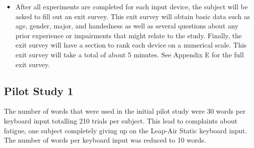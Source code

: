 \begin{itemize}
\begin{itemize}
\end{itemize}
\item After all experiments are completed for each input device, the subject will be asked to fill out an exit survey. This exit survey will obtain basic data such as age, gender, major, and handedness as well as several questions about any prior experience or impairments that might relate to the study. Finally, the exit survey will have a section to rank each device on a numerical scale. This exit survey will take a total of about 5 minutes. See Appendix E for the full exit survey.
\end{itemize}

\begin{table}[h]
\centering
\caption[Schedule of Assessments]{\centering Schedule of Assessments for a single study visit (in minutes).}
\label{table_schedule_of_assessments}
\end{table}

\subsection{Pilot Study 1}

The number of words that were used in the initial pilot study were 30 words per keyboard input totalling 210 trials per subject. This lead to complaints about fatigue, one subject completely giving up on the Leap-Air Static keyboard input. The number of words per keyboard input was reduced to 10 words.

